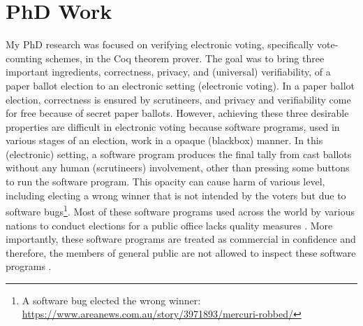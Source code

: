 \documentclass[a4paper]{article}
\begin{document}
\section{PhD Work}
My PhD research was focused on verifying electronic voting, specifically vote-counting schemes, in 
the Coq theorem prover. The goal was to 
bring  three important ingredients, correctness, privacy, and (universal) verifiability, of a paper ballot election to 
an electronic setting (electronic voting). In a paper ballot election, correctness is
ensured by scrutineers, and privacy and verifiability  
come for free because of secret paper ballots.  However, achieving these three desirable properties 
are difficult in 
electronic voting because software programs, used in 
various stages of an election, work in a opaque (blackbox) manner. In this (electronic) setting, 
a software program produces the final tally from cast ballots without any human (scrutineers) involvement, 
other than pressing some 
buttons to run the software program. This opacity can cause harm of various level, including electing a 
wrong winner that is not intended by the voters but due to 
software bugs\footnote{A software bug elected the wrong winner: \url{https://www.areanews.com.au/story/3971893/mercuri-robbed/}}. Most of 
these software programs used across the world by various nations to conduct elections for a public office 
lacks quality measures \cite{10.1145/3014812.3014837, 9152765}. More importantly, these software programs are 
treated as commercial in confidence and therefore,
the members of general public are not allowed to inspect these software programs \cite{AEC:2013:LMM}.
\end{document}
